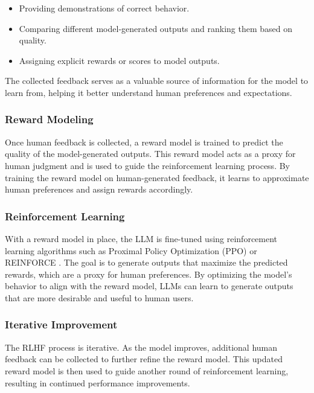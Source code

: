 \begin{itemize}
    \item Providing demonstrations of correct behavior.
    \item Comparing different model-generated outputs and ranking them based on quality.
    \item Assigning explicit rewards or scores to model outputs.
\end{itemize}

The collected feedback serves as a valuable source of information for the model to learn from, helping it better understand human preferences and expectations.

\subsubsection*{Reward Modeling}

Once human feedback is collected, a reward model is trained to predict the quality of the model-generated outputs. This reward model acts as a proxy for human judgment and is used to guide the reinforcement learning process. By training the reward model on human-generated feedback, it learns to approximate human preferences and assign rewards accordingly.

\subsubsection*{Reinforcement Learning}

With a reward model in place, the LLM is fine-tuned using reinforcement learning algorithms such as Proximal Policy Optimization (PPO) \cite{schulman2017proximal} or REINFORCE \cite{ahmadian2024basics}. The goal is to generate outputs that maximize the predicted rewards, which are a proxy for human preferences. By optimizing the model's behavior to align with the reward model, LLMs can learn to generate outputs that are more desirable and useful to human users.

\subsubsection*{Iterative Improvement}

The RLHF process is iterative. As the model improves, additional human feedback can be collected to further refine the reward model. This updated reward model is then used to guide another round of reinforcement learning, resulting in continued performance improvements.

